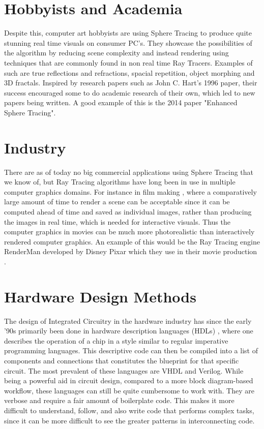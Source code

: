 	\section{ Hobbyists and Academia }

		Despite this, computer art hobbyists are using Sphere Tracing to
		produce quite stunning real time visuals on consumer PC's. They
		showcase the possibilities of the algorithm by reducing scene
		complexity and instead rendering using techniques that are commonly
		found in non real time Ray Tracers. Examples of such are true
		reflections and refractions, spacial repetition, object morphing and 3D
		fractals\cite{InigoQuilez}.  Inspired by research papers such as John
		C. Hart's 1996 paper\cite{Hart1996}, their success encouraged some
		to do academic research of their own, which led to new papers being
		written. A good example of this is the 2014 paper "Enhanced Sphere
		Tracing"\cite{Korndorfer2014}.

	\section{ Industry }		

		There are as of today no big commercial applications using Sphere
		Tracing that we know of, but Ray Tracing algorithms have long been in
		use in multiple computer graphics domains. For instance in film
		making \cite{Christensen2006}, where a comparatively large amount of
		time to render a scene can be acceptable since it can be computed
		ahead of time and saved as individual images, rather than producing
		the images in real time, which is needed for interactive visuals.
		Thus the computer graphics in movies can be much more photorealistic
		than interactively rendered computer graphics. An example of this
		would be the Ray Tracing engine RenderMan developed by Disney Pixar
		which they use in their movie production \cite{Christensen2006}.

	\section{ Hardware Design Methods } 
	
		The design of Integrated Circuitry in the hardware industry has since
		the early '90s primarily been done in hardware description languages
		(HDLs) \cite{Chen2012}, where one describes the operation of a chip in a
		style similar to regular imperative programming languages. This
		descriptive code can then be compiled into a list of components and
		connections that constitutes the blueprint for that specific circuit.
		The most prevalent of these languages are VHDL and
		Verilog\cite{Chen2012}. While being a powerful aid in circuit design,
		compared to a more block diagram-based workflow\cite{Lauwereins2008},
		these languages can still be quite cumbersome to work with. They are
		verbose and require a fair amount of boilerplate code. This makes it
		more difficult to understand, follow, and also write code that
		performs complex tasks, since it can be more difficult to see the
		greater patterns in interconnecting code.
		
